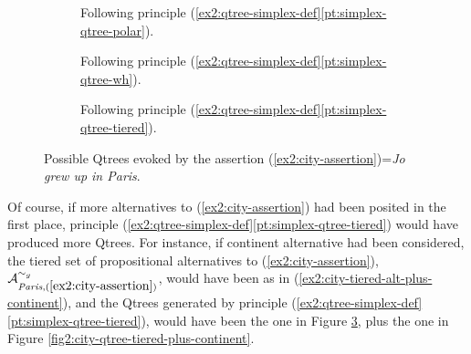 \begin{figure}[H]
	\centering
	\begin{subfigure}[t]{.23\linewidth}
		\centering
		\caption{Following principle (\ref{ex2:qtree-simplex-def}\ref{pt:simplex-qtree-polar}).}\label{fig2:city-qtree-polar}
	\end{subfigure}
	\hfill
	\begin{subfigure}[t]{.33\linewidth}
		\centering		{}
		\caption{Following principle (\ref{ex2:qtree-simplex-def}\ref{pt:simplex-qtree-wh}).}\label{fig2:city-qtree-wh}
	\end{subfigure}
	\hfill
	\begin{subfigure}[t]{.38\linewidth}
		\centering{}
		\caption{Following principle (\ref{ex2:qtree-simplex-def}\ref{pt:simplex-qtree-tiered}).}\label{fig2:city-qtree-tiered}
	\end{subfigure}
	\caption{Possible Qtrees evoked by the assertion (\ref{ex2:city-assertion})=\textit{Jo grew up in Paris}.}\label{fig2:city-qtrees}
\end{figure}

Of course, if more alternatives to (\ref{ex2:city-assertion}) had been posited in the first place, principle (\ref{ex2:qtree-simplex-def}\ref{pt:simplex-qtree-tiered}) would have produced more Qtrees. For instance, if continent alternative had been considered, the tiered set of propositional alternatives to (\ref{ex2:city-assertion}), $\mathcal{A}_{\textit{Paris}, (\ref{ex2:city-assertion})}^{\sim_g}$, would have been as in (\ref{ex2:city-tiered-alt-plus-continent}), and the Qtrees generated by principle (\ref{ex2:qtree-simplex-def}\ref{pt:simplex-qtree-tiered}), would have been the one in Figure \ref{fig2:city-qtree-tiered}, plus the one in Figure \ref{fig2:city-qtree-tiered-plus-continent}.

